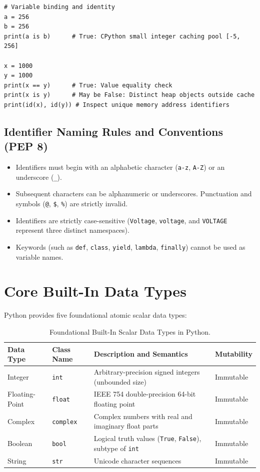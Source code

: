 \begin{lstlisting}[caption={Demonstrating Object Identity and References in Python}]
# Variable binding and identity
a = 256
b = 256
print(a is b)      # True: CPython small integer caching pool [-5, 256]

x = 1000
y = 1000
print(x == y)      # True: Value equality check
print(x is y)      # May be False: Distinct heap objects outside cache
print(id(x), id(y)) # Inspect unique memory address identifiers
\end{lstlisting}

\subsection{Identifier Naming Rules and Conventions (PEP 8)}
\begin{itemize}[leftmargin=1.8em, itemsep=3pt]
    \item Identifiers must begin with an alphabetic character (\texttt{a-z}, \texttt{A-Z}) or an underscore (\texttt{\_}).
    \item Subsequent characters can be alphanumeric or underscores. Punctuation and symbols (\texttt{@}, \texttt{\$}, \texttt{\%}) are strictly invalid.
    \item Identifiers are strictly case-sensitive (\texttt{Voltage}, \texttt{voltage}, and \texttt{VOLTAGE} represent three distinct namespaces).
    \item Keywords (such as \texttt{def}, \texttt{class}, \texttt{yield}, \texttt{lambda}, \texttt{finally}) cannot be used as variable names.
\end{itemize}

\section{Core Built-In Data Types}

Python provides five foundational atomic scalar data types:

\begin{table}[htbp]
\centering
\begin{tabularx}{\textwidth}{l l X l}
\toprule
\textbf{Data Type} & \textbf{Class Name} & \textbf{Description and Semantics} & \textbf{Mutability} \\
\midrule
Integer & \texttt{int} & Arbitrary-precision signed integers (unbounded size) & Immutable \\
Floating-Point & \texttt{float} & IEEE 754 double-precision 64-bit floating point & Immutable \\
Complex & \texttt{complex} & Complex numbers with real and imaginary float parts & Immutable \\
Boolean & \texttt{bool} & Logical truth values (\texttt{True}, \texttt{False}), subtype of \texttt{int} & Immutable \\
String & \texttt{str} & Unicode character sequences & Immutable \\
\bottomrule
\end{tabularx}
\caption{Foundational Built-In Scalar Data Types in Python.}
\label{tab:scalar_types}
\end{table}

